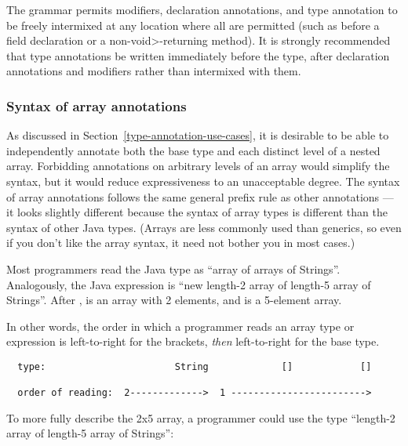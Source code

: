\documentclass[10pt]{article}
\begin{document}
The grammar permits modifiers, declaration annotations, and type annotation
to be freely intermixed at any location where all are permitted (such as
before a field declaration or a non-\<void>-returning method).  It is
strongly recommended that type annotations be written immediately before
the type, after declaration annotations and modifiers rather than
intermixed with them.


\subsubsection{Syntax of array annotations\label{array-syntax}}

As discussed in Section~\ref{type-annotation-use-cases}, it is
desirable to be able to independently annotate both the base type and
each distinct level of a nested array.
Forbidding annotations on arbitrary levels of an array would simplify the
syntax, but it would reduce expressiveness to an unacceptable degree.
The syntax of array annotations follows the same general prefix rule as
other annotations --- it looks slightly different because the syntax
of array types is different than the syntax of other Java types.
(Arrays are less commonly used than generics, so even if you don't like the
array syntax, it need not bother you in most cases.)

Most programmers read the Java type  as
``array of arrays of Strings''.  Analogously, the Java expression
 is ``new length-2 array of length-5 array of Strings''.
After ,  is an array with
2 elements, and  is a 5-element array.

In other words, the order in which a programmer reads an array type or
expression is left-to-right for the
brackets, \emph{then} left-to-right for the base type.

\begin{Verbatim}
  type:                       String             []            []

  order of reading:  2------------->  1 ------------------------>
\end{Verbatim}



To more fully describe the 2x5 array, a programmer could use the
type ``length-2 array of length-5 array of Strings'':
\end{document}
